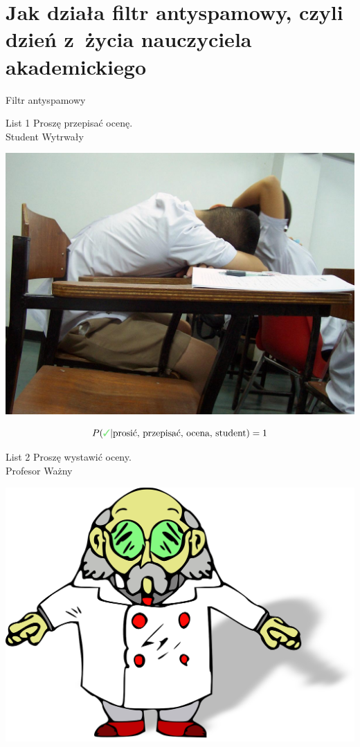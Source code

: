 \documentclass{mp}
\begin{document}
\part{Jak działa filtr antyspamowy, czyli dzień z~życia nauczyciela akademickiego}
\frame{\partpage}
\begin{frame}{Filtr antyspamowy}
{
	\begin{minipage}{.50\textwidth}
\begin{block}{List 1}
Proszę przepisać ocenę.\\
Student Wytrwały
\end{block}
\end{minipage}
\hfill
\begin{minipage}{.45\textwidth}
\includegraphics[width=\textwidth]{Sleeping_students.jpg}\\
\end{minipage}
\[ P(\cmark | \text{prosić, przepisać, ocena, student})=1 \]
}
{
	\begin{minipage}{.50\textwidth}
\begin{block}{List 2}
Proszę wystawić oceny.\\
Profesor Ważny
\end{block}
\end{minipage}
\hfill
\begin{minipage}{.45\textwidth}
\includegraphics[width=\textwidth]{scientist-28748_1280.png}\\

\end{minipage}}
\end{frame}
\end{document}
